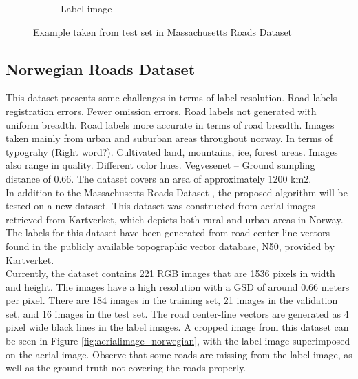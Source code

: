 \begin{figure}
\begin{subfigure}{0.48\textwidth}
\caption{Label image} \label{fig:mass_roads_example_label}
\end{subfigure}
\hspace*{\fill} %
\caption{Example taken from test set in Massachusetts Roads Dataset} \label{fig:mass_roads_example}
\end{figure}





\subsection{Norwegian Roads Dataset}

This dataset presents some challenges in terms of label resolution. Road labels registration errors. Fewer omission errors.
Road labels not generated with uniform breadth. Road labels more accurate in terms of road breadth. Images taken mainly from urban and suburban areas throughout norway. In terms of typograhy (Right word?). Cultivated land, mountains, ice, forest areas. Images also range in quality. Different color hues. Vegvesenet --
Ground sampling distance of 0.66. 
The dataset covers an area of approximately 
1200 km2.\\

In addition to the Massachusetts Roads Dataset \citep{MnihThesis}, the proposed algorithm will be tested on a new dataset. This dataset was constructed from aerial images retrieved from Kartverket, which depicts both rural and urban areas in Norway. The labels for this dataset have been generated from road center-line vectors found in the publicly available topographic vector database, N50, provided by Kartverket. \\

Currently, the dataset contains 221 RGB images that are 1536 pixels in width and height. The images have a high resolution with a \ac{GSD} of around 0.66 meters per pixel. There are 184 images in the training set, 21 images in the validation set, and 16 images in the test set. The road center-line vectors are generated as 4 pixel wide black lines in the label images. A cropped image from this dataset can be seen in Figure \ref{fig:aerialimage_norwegian}, with the label image superimposed on the aerial image. Observe that some roads are missing from the label image, as well as the ground truth not covering the roads properly. \\

